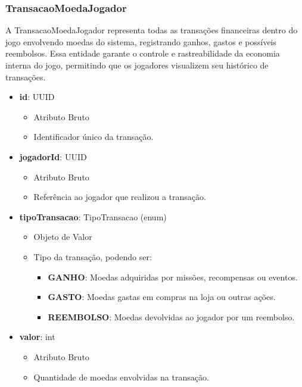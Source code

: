     \subsubsection{TransacaoMoedaJogador}
    A TransacaoMoedaJogador representa todas as transações financeiras dentro do jogo envolvendo moedas do sistema, registrando ganhos, gastos e possíveis reembolsos. Essa entidade garante o controle e rastreabilidade da economia interna do jogo, permitindo que os jogadores visualizem seu histórico de transações.
    \begin{itemize}
        \item \textbf{id}: UUID  
              \begin{itemize}
                  \item Atributo Bruto
                  \item Identificador único da transação.
              \end{itemize}
    
        \item \textbf{jogadorId}: UUID  
              \begin{itemize}
                  \item Atributo Bruto
                  \item Referência ao jogador que realizou a transação.
              \end{itemize}
    
        \item \textbf{tipoTransacao}: TipoTransacao (enum)  
              \begin{itemize}
                  \item Objeto de Valor
                  \item Tipo da transação, podendo ser:
                  \begin{itemize}
                      \item \textbf{GANHO}: Moedas adquiridas por missões, recompensas ou eventos.
                      \item \textbf{GASTO}: Moedas gastas em compras na loja ou outras ações.
                      \item \textbf{REEMBOLSO}: Moedas devolvidas ao jogador por um reembolso.
                  \end{itemize}
              \end{itemize}
    
        \item \textbf{valor}: int  
              \begin{itemize}
                  \item Atributo Bruto
                  \item Quantidade de moedas envolvidas na transação.
              \end{itemize}
    

\end{itemize}
